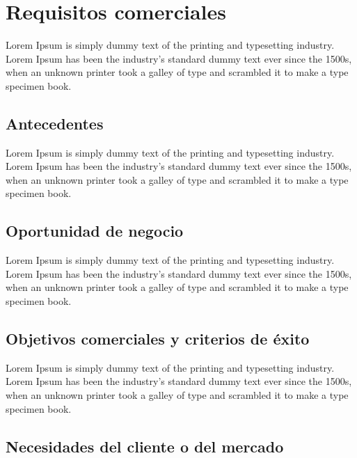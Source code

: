 \documentclass[12pt]{article}
\begin{document}
\newpage
\maketitle

\newpage \tableofcontents

\newpage \section{Requisitos comerciales}

Lorem Ipsum is simply dummy text of the printing and typesetting industry. Lorem Ipsum has been the industry's standard dummy text ever since the 1500s, when an unknown printer took a galley of type and scrambled it to make a type specimen book.
 
\subsection{Antecedentes}\label{ant}

Lorem Ipsum is simply dummy text of the printing and typesetting industry. Lorem Ipsum has been the industry's standard dummy text ever since the 1500s, when an unknown printer took a galley of type and scrambled it to make a type specimen book.

\subsection{Oportunidad de negocio}\label{on}

Lorem Ipsum is simply dummy text of the printing and typesetting industry. Lorem Ipsum has been the industry's standard dummy text ever since the 1500s, when an unknown printer took a galley of type and scrambled it to make a type specimen book.

\subsection{Objetivos comerciales y criterios de éxito}\label{occe}

Lorem Ipsum is simply dummy text of the printing and typesetting industry. Lorem Ipsum has been the industry's standard dummy text ever since the 1500s, when an unknown printer took a galley of type and scrambled it to make a type specimen book.

\subsection{Necesidades del cliente o del mercado}\label{ncm}
\end{document}
